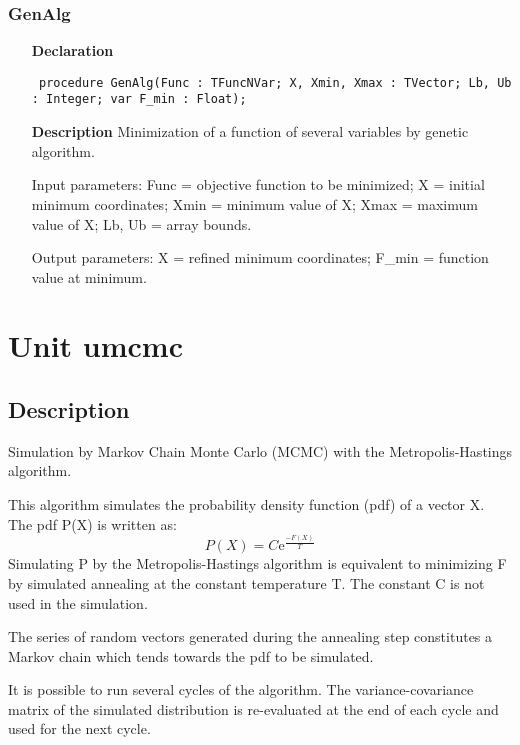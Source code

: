 \documentclass[12pt,a4paper,oneside]{report}
\newcommand{\euler}{\mathrm{e}}
\newcommand{\declarationitem}[1]{\textbf{#1}}
\newcommand{\descriptiontitle}[1]{\textbf{#1}}
\newcommand{\code}[1]{\texttt{#1}}
\begin{document}
\subsubsection{GenAlg}
\label{ugenalg-GenAlg}
\begin{itemize}\item[\declarationitem{Declaration}\hfill]
	\begin{flushleft}
		\code{
			procedure GenAlg(Func : TFuncNVar; X, Xmin, Xmax : TVector; Lb, Ub : Integer; var F{\_}min : Float);}
		
	\end{flushleft}
	
	\par
	\item[\descriptiontitle{Description}]
	Minimization of a function of several variables by genetic algorithm.
	
	Input parameters: Func = objective function to be minimized; X = initial minimum coordinates; Xmin = minimum value of X; Xmax = maximum value of X; Lb, Ub = array bounds.
	
	Output parameters: X = refined minimum coordinates; F{\_}min = function value at minimum.
	
\end{itemize}


\section{Unit umcmc}
\label{umcmc}
\subsection{Description}
Simulation by Markov Chain Monte Carlo (MCMC) with the Metropolis{-}Hastings algorithm.

This algorithm simulates the probability density function (pdf) of a vector X. The pdf P(X) is written as:
$$
P(X) = C \euler^{\frac{-F(X)}{T}}
$$
Simulating P by the Metropolis-Hastings algorithm is equivalent to minimizing F by simulated annealing at the constant temperature T. The constant C is not used in the simulation.

The series of random vectors generated during the annealing step constitutes a Markov chain which tends towards the pdf to be simulated.

It is possible to run several cycles of the algorithm. The variance{-}covariance matrix of the simulated distribution is re{-}evaluated at the end of each cycle and used for the next cycle.
\end{document}
